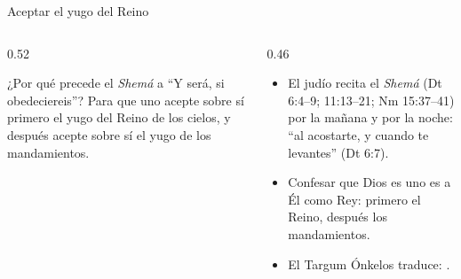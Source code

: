 \begin{frame}{Aceptar el yugo del Reino}
\begin{columns}[t,onlytextwidth]
\begin{column}{0.52\textwidth}
\begin{cita}[colback=dorado!10!papiro,colframe=dorado!80!azul,fontupper=\scriptsize\itshape]¿Por qué precede el \emph{Shemá} a ``Y será, si obedeciereis''? Para que uno acepte sobre sí primero el yugo del Reino de los cielos, y después acepte sobre sí el yugo de los mandamientos.\end{cita}
\begin{center}\scriptsize{}\end{center}
\end{column}
\begin{column}{0.46\textwidth}\small
\begin{itemize}
\item El judío recita el \emph{Shemá} (Dt 6:4--9; 11:13--21; Nm 15:37--41) por la mañana y por la noche: ``al acostarte, y cuando te levantes'' (Dt 6:7).
\item Confesar que Dios es uno es  a Él como Rey: primero el Reino, después los mandamientos.
\item El Targum Ónkelos traduce: .
\end{itemize}
\end{column}
\end{columns}
\end{frame}

